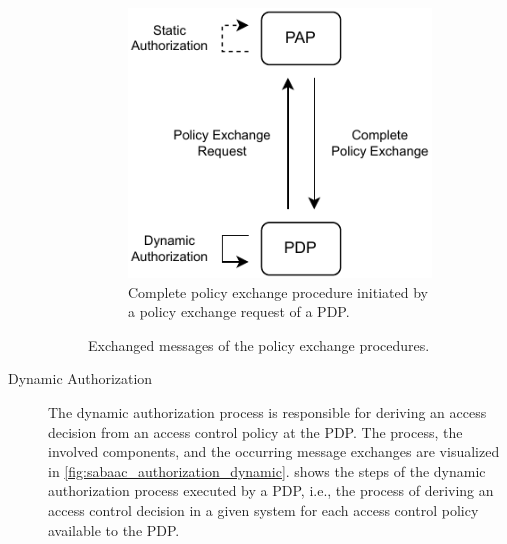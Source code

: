 \begin{description}
\begin{figure}
\begin{subfigure}[t]{0.48\linewidth}
            \includegraphics[width=\linewidth]{figures/SABAAC_protocols_authorization_dynamic_policyexchange_complete.drawio.pdf}
            \caption{Complete policy exchange procedure initiated by a policy exchange request of a PDP.}
            \label{fig:sabaac_authorization_dynamic_policyexchange_complete}
        \end{subfigure}
        \caption{Exchanged messages of the policy exchange procedures.
        }
        \label{fig:sabaac_authorization_dynamic_policyexchange}
    \end{figure}
    \item[Dynamic Authorization] The dynamic authorization process is responsible for deriving an access decision from an access control policy at the PDP.
    The process, the involved components, and the occurring message exchanges are visualized in \autoref{fig:sabaac_authorization_dynamic}.
     shows the steps of the dynamic authorization process executed by a PDP, i.e., the process of deriving an access control decision in a given system for each access control policy available to the PDP.

\end{description}
